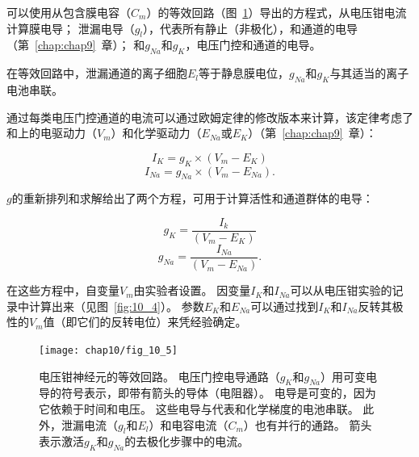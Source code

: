 \begin{proposition}[从电压钳数据计算膜电导] \label{box:10_2}
	
	\quad \quad 可以使用从包含膜电容（$C_m$）的等效回路（图~\ref{fig:10_5}）导出的方程式，从电压钳电流计算膜电导；
	泄漏电导（$g_l$），代表所有静止（非极化），和通道的电导（第~\ref{chap:chap9}~章）；
	和$g_{Na}$和$g_K$，电压门控和通道的电导。
	
	\quad \quad 在等效回路中，泄漏通道的离子细胞$E_l$等于静息膜电位，$g_{Na}$和$g_K$与其适当的离子电池串联。
	
	\quad \quad 通过每类电压门控通道的电流可以通过欧姆定律的修改版本来计算，该定律考虑了和上的电驱动力（$V_m$）和化学驱动力（$E_{Na}$或$E_K$）（第~\ref{chap:chap9}~章）：
	
	\begin{equation}
		I_K = g_K \times (V_m - E_K)
	\end{equation}
	\begin{equation}
		I_{Na} = g_{Na} \times (V_m - E_{Na}).
	\end{equation}
	
	\quad \quad $g$的重新排列和求解给出了两个方程，可用于计算活性和通道群体的电导：
	
	\begin{equation}
		g_K = \frac{I_k}{(V_m - E_K)}
	\end{equation}
	\begin{equation}
		g_{Na} = \frac{I_{Na}}{(V_m - E_{Na})}.
	\end{equation}
	
	\quad \quad 在这些方程中，自变量$V_m$由实验者设置。
	因变量$I_K$和$I_{Na}$可以从电压钳实验的记录中计算出来（见图~\ref{fig:10_4}）。
	参数$E_K$和$E_{Na}$可以通过找到$I_K$和$I_{Na}$反转其极性的$V_m$值（即它们的反转电位）来凭经验确定。
	
\end{proposition}


\begin{figure}[htbp]
	\centering
	\texttt{[image: chap10/fig\_10\_5]}
	\caption{电压钳神经元的等效回路。
		电压门控电导通路（$g_K$和$g_{Na}$）用可变电导的符号表示，即带有箭头的导体（电阻器）。
		电导是可变的，因为它依赖于时间和电压。
		这些电导与代表和化学梯度的电池串联。
		此外，泄漏电流（$g_l$和$E_l$）和电容电流（$C_m$）也有并行的通路。
		箭头表示激活$g_K$和$g_{Na}$的去极化步骤中的电流。}
	\label{fig:10_5}
\end{figure}


